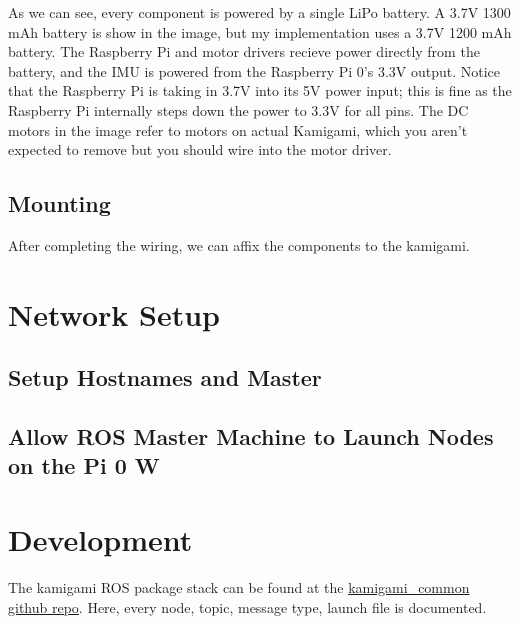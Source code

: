 \documentclass[11pt]{article}
\begin{document}
As we can see, every component is powered by a single LiPo battery. A 3.7V 1300 mAh battery is show in the image, but my implementation uses a 3.7V 1200 mAh battery. The Raspberry Pi and motor drivers recieve power directly from the battery, and the IMU is powered from the Raspberry Pi 0's 3.3V output. Notice that the Raspberry Pi is taking in 3.7V into its 5V power input; this is fine as the Raspberry Pi internally steps down the power to 3.3V for all pins. The DC motors in the image refer to motors on actual Kamigami, which you aren't expected to remove but you should wire into the motor driver.

\subsection{Mounting}
After completing the wiring, we can affix the components to the kamigami.


\section{Network Setup}

\subsection{Setup Hostnames and Master}

\subsection{Allow ROS Master Machine to Launch Nodes on the Pi 0 W}

\section{Development}

The kamigami ROS package stack can be found at the \href{https://github.com/BML-MultiRobot/kamigami_common}{kamigami\_common github repo}. Here, every node, topic, message type, launch file is documented.
\end{document}
